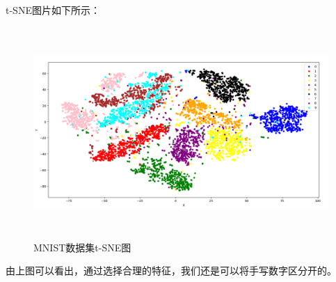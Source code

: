 \documentclass[UTF8]{article}
\begin{document}
t-SNE图片如下所示：
\begin{figure}[H]
	\caption{MNIST数据集t-SNE图}
	\label{f000032001}
	\centering
	\includegraphics[height=8cm]{images/f000032}
\end{figure}
由上图可以看出，通过选择合理的特征，我们还是可以将手写数字区分开的。
\end{document}
